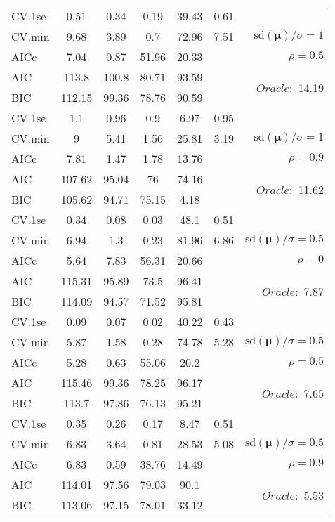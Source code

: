 \begin{table}
\begin{center}
\begin{tabular}{l*{5}{c}|r}
 \hline 
CV.1se & 0.51 & 0.34 & 0.19 & 39.43 & 0.61 & \\
CV.min & 9.68 & 3.89 & 0.7 & 72.96 & 7.51 &  $\mathrm{sd}(\mathbf{\mu})/\sigma=1$ \\
AICc & 7.04 & 0.87 & 51.96 & 20.33 & & $\rho=0.5$ \\
AIC & 113.8 & 100.8 & 80.71 & 93.59 & &  \multirow{2}{*}{$Oracle: $ 14.19} \\
BIC & 112.15 & 99.36 & 78.76 & 90.59 & &  \\
 \hline 
CV.1se & 1.1 & 0.96 & 0.9 & 6.97 & 0.95 & \\
CV.min & 9 & 5.41 & 1.56 & 25.81 & 3.19 &  $\mathrm{sd}(\mathbf{\mu})/\sigma=1$ \\
AICc & 7.81 & 1.47 & 1.78 & 13.76 & & $\rho=0.9$ \\
AIC & 107.62 & 95.04 & 76 & 74.16 & &  \multirow{2}{*}{$Oracle: $ 11.62} \\
BIC & 105.62 & 94.71 & 75.15 & 4.18 & &  \\
 \hline 
CV.1se & 0.34 & 0.08 & 0.03 & 48.1 & 0.51 & \\
CV.min & 6.94 & 1.3 & 0.23 & 81.96 & 6.86 &  $\mathrm{sd}(\mathbf{\mu})/\sigma=0.5$ \\
AICc & 5.64 & 7.83 & 56.31 & 20.66 & & $\rho=0$ \\
AIC & 115.31 & 95.89 & 73.5 & 96.41 & &  \multirow{2}{*}{$Oracle: $ 7.87} \\
BIC & 114.09 & 94.57 & 71.52 & 95.81 & &  \\
 \hline 
CV.1se & 0.09 & 0.07 & 0.02 & 40.22 & 0.43 & \\
CV.min & 5.87 & 1.58 & 0.28 & 74.78 & 5.28 &  $\mathrm{sd}(\mathbf{\mu})/\sigma=0.5$ \\
AICc & 5.28 & 0.63 & 55.06 & 20.2 & & $\rho=0.5$ \\
AIC & 115.46 & 99.36 & 78.25 & 96.17 & &  \multirow{2}{*}{$Oracle: $ 7.65} \\
BIC & 113.7 & 97.86 & 76.13 & 95.21 & &  \\
 \hline 
CV.1se & 0.35 & 0.26 & 0.17 & 8.47 & 0.51 & \\
CV.min & 6.83 & 3.64 & 0.81 & 28.53 & 5.08 &  $\mathrm{sd}(\mathbf{\mu})/\sigma=0.5$ \\
AICc & 6.83 & 0.59 & 38.76 & 14.49 & & $\rho=0.9$ \\
AIC & 114.01 & 97.56 & 79.03 & 90.1 & &  \multirow{2}{*}{$Oracle: $ 5.53} \\
BIC & 113.06 & 97.15 & 78.01 & 33.12 & &  \\
 \hline 
\end{tabular}
\end{center}
\vspace{-1cm}
\end{table}





